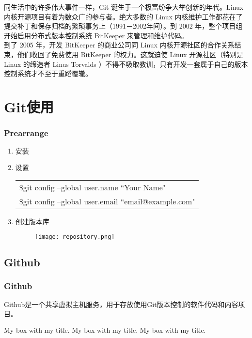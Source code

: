 \documentclass[notheorems,mathserif,table,compress]{beamer}  %
\newcommand\zhushadow[2][purple]{\hskip5pt\shadowbox{\color{#1}\small\kai #2\vspace{3mm}}}
\begin{document}
\begin{frame}
  同生活中的许多伟大事件一样，Git 诞生于一个极富纷争大举创新的年代。Linux 内核开源项目有着为数众广的参与者。绝大多数的 Linux 内核维护工作都花在了提交补丁和保存归档的繁琐事务上（1991－2002年间）。到 2002 年，整个项目组开始启用分布式版本控制系统   BitKeeper 来管理和维护代码。\\
  到了 2005 年，开发 BitKeeper 的商业公司同 Linux 内核开源社区的合作关系结束，他们收回了免费使用 BitKeeper 的权力。这就迫使 Linux 开源社区（特别是 Linux 的缔造者 Linus Torvalds ）不得不吸取教训，只有开发一套属于自己的版本控制系统才不至于重蹈覆辙。
\end{frame}

\section{Git使用}

\begin{frame}
  \frametitle{Prearrange}
  \flushleft
  \begin{enumerate}
  \item 安装
  \item 设置
  \newline
  \begin{tabular}{|l|}
  \hline
  \$git config --global user.name ``Your Name" \\
  \$git config --global user.email ``email@example.com"\\
  \hline
  \end{tabular}
  \item 创建版本库
  \begin{figure}[h]
  \centerline{\texttt{[image: repository.png]}}
  \end{figure}
  \end{enumerate}
\end{frame}

\subsection{Github}

\begin{frame}
  \frametitle{Github}
  \zhushadow{Github} Github是一个共享虚拟主机服务，用于存放使用Git版本控制的软件代码和内容项目。
\end{frame}


\begin{frame}
  \begin{tcolorbox}[colback=blue!15,colframe=blue!75!black]  
  My box with my title.    My box with my title.    My box with my title.  
  \end{tcolorbox}
\end{frame}
\end{document}
